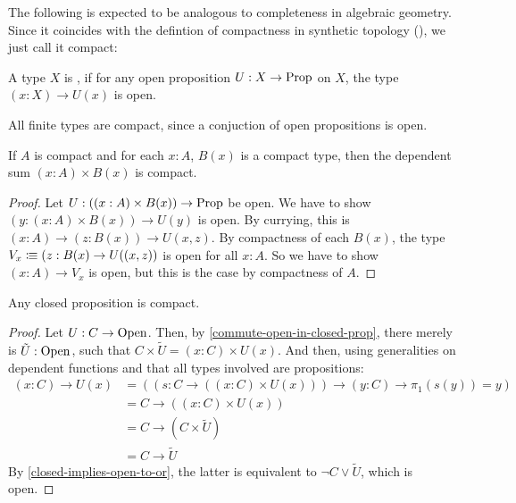 
The following is expected to be analogous to completeness in algebraic geometry.
Since it coincides with the defintion of compactness in synthetic topology (\cite{MISSING}),
we just call it compact:

\begin{definition}
  A type $X$ is ,
  if for any open proposition $U:X\to\mathrm{Prop}$ on $X$,
  the type $(x:X)\to U(x)$ is open.
\end{definition}

\begin{example}
  All finite types are compact, since a conjuction of open propositions is open.
\end{example}

\begin{lemma}
  \label{dependent-sum-compact}
  If $A$ is compact and for each $x:A$, $B(x)$ is a compact type,
  then the dependent sum $(x:A)\times B(x)$ is compact.
\end{lemma}

\begin{proof}
  Let $U:((x:A)\times B(x))\to\mathrm{Prop}$ be open.
  We have to show $(y:(x:A)\times B(x))\to U(y)$ is open.
  By currying, this is $(x:A)\to (z:B(x))\to U(x,z)$.
  By compactness of each $B(x)$, the type $V_x\vcentcolon\mspace{-1.2mu}\equiv (z:B(x)\to U((x,z))$ is open for all $x:A$.
  So we have to show $(x:A)\to V_x$ is open, but this is the case by compactness of $A$.
\end{proof}

\begin{lemma}
  \label{closed-proposition-compact}
  Any closed proposition is compact.
\end{lemma}

\begin{proof}
  Let $U:C\to\mathrm{Open}$.
  Then, by \cref{commute-open-in-closed-prop},
  there merely is $\tilde{U}:\mathrm{Open}$,
  such that $C\times\tilde{U}=(x:C)\times U(x)$.
  And then, using generalities on dependent functions and that all types involved are propositions:
  \begin{align*}
    (x:C)\to U(x) &= ((s: C\to ((x:C)\times U(x)))\to (y:C) \to \pi_1(s(y))=y) \\
                  &= C\to ((x:C)\times U(x)) \\
                  &= C\to (C\times\tilde{U}) \\
                  &= C\to\tilde{U}
  \end{align*}
  By \cref{closed-implies-open-to-or}, the latter is equivalent to $\neg C\vee \tilde{U}$,
  which is open.
\end{proof}

